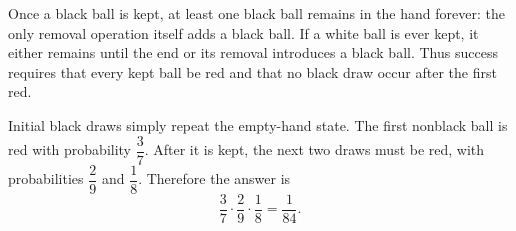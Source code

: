 Once a black ball is kept, at least one black ball remains in the hand forever: the only removal operation itself adds a black ball. If a white ball is ever kept, it either remains until the end or its removal introduces a black ball. Thus success requires that every kept ball be red and that no black draw occur after the first red.

Initial black draws simply repeat the empty-hand state. The first nonblack ball is red with probability $\dfrac{3}{7}$. After it is kept, the next two draws must be red, with probabilities $\dfrac{2}{9}$ and $\dfrac{1}{8}$. Therefore the answer is
\[
\boxed{\dfrac{3}{7}\cdot\dfrac{2}{9}\cdot\dfrac{1}{8}=\dfrac{1}{84}}.
\]
